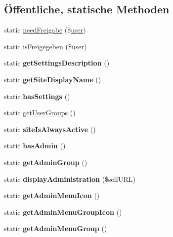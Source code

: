 \subsection*{Öffentliche, statische Methoden}
\begin{DoxyCompactItemize}
\item 
static \mbox{\hyperlink{classdatenschutz_a9b42f8bbc5c58d54f76809f369c31b84}{need\+Freigabe}} (\$\mbox{\hyperlink{classuser}{user}})
\item 
static \mbox{\hyperlink{classdatenschutz_ad42f7c79d164d11c9dd8c90e8afcf714}{is\+Freigegeben}} (\$\mbox{\hyperlink{classuser}{user}})
\item 
\mbox{\label{classdatenschutz_a3fab5bbc611413b15d4de5268943d026}} 
static {\bfseries get\+Settings\+Description} ()
\item 
\mbox{\label{classdatenschutz_a7bec391b08f49e93e6069c80d84a5277}} 
static {\bfseries get\+Site\+Display\+Name} ()
\item 
\mbox{\label{classdatenschutz_aad4f30ba2b12ecf24ad3fbb12aebc4a0}} 
static {\bfseries has\+Settings} ()
\item 
static \mbox{\hyperlink{classdatenschutz_a1c4d1653e6e2897f18fe5bc50e479cd4}{get\+User\+Groups}} ()
\item 
\mbox{\label{classdatenschutz_ae17477f6f7a08befadf52f5799d1c081}} 
static {\bfseries site\+Is\+Always\+Active} ()
\item 
\mbox{\label{classdatenschutz_ab260cf4c5fad2bd31d8af2d14bf87d2b}} 
static {\bfseries has\+Admin} ()
\item 
\mbox{\label{classdatenschutz_a18f680d44d0d6bb67929a09636de226c}} 
static {\bfseries get\+Admin\+Group} ()
\item 
\mbox{\label{classdatenschutz_a330a0ddf0c845afc579201308a5dd2f0}} 
static {\bfseries display\+Administration} (\$self\+U\+RL)
\item 
\mbox{\label{classdatenschutz_abfcb4d223ccf19a76daf14850887de49}} 
static {\bfseries get\+Admin\+Menu\+Icon} ()
\item 
\mbox{\label{classdatenschutz_af8b014e780ef7f7375cd3fb32a6b11c0}} 
static {\bfseries get\+Admin\+Menu\+Group\+Icon} ()
\item 
\mbox{\label{classdatenschutz_a958115993e8aa98c4bcd10b93e337f1f}} 
static {\bfseries get\+Admin\+Menu\+Group} ()
\end{DoxyCompactItemize}
